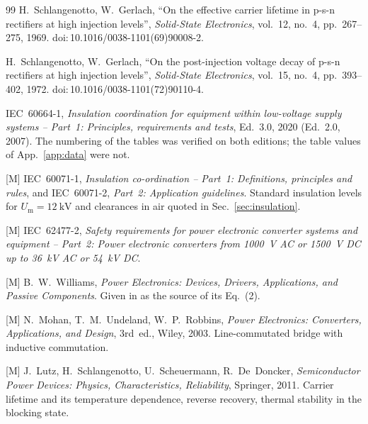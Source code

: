 \documentclass[10pt,a4paper]{scrartcl}
\begin{document}
\begin{thebibliography}{99}
H.~Schlangenotto, W.~Gerlach, ``On the effective carrier lifetime in p-s-n rectifiers at high injection levels'', \emph{Solid-State Electronics}, vol.~12, no.~4, pp.~267--275, 1969. doi:\,10.1016/0038-1101(69)90008-2.

H.~Schlangenotto, W.~Gerlach, ``On the post-injection voltage decay of p-s-n rectifiers at high injection levels'', \emph{Solid-State Electronics}, vol.~15, no.~4, pp.~393--402, 1972. doi:\,10.1016/0038-1101(72)90110-4.

IEC~60664-1, \emph{Insulation coordination for equipment within low-voltage supply systems -- Part~1: Principles, requirements and tests}, Ed.~3.0, 2020 (Ed.~2.0, 2007). The numbering of the tables was verified on both editions; the table values of App.~\ref{app:data} were not.

[M] IEC~60071-1, \emph{Insulation co-ordination -- Part~1: Definitions, principles and rules}, and IEC~60071-2, \emph{Part~2: Application guidelines}. Standard insulation levels for $U_\mathrm{m} = \SI{12}{\kilo\volt}$ and clearances in air quoted in Sec.~\ref{sec:insulation}.

[M] IEC~62477-2, \emph{Safety requirements for power electronic converter systems and equipment -- Part~2: Power electronic converters from 1000~V AC or 1500~V DC up to 36~kV AC or 54~kV DC}.

[M] B.~W.~Williams, \emph{Power Electronics: Devices, Drivers, Applications, and Passive Components}. Given in \cite{an6531} as the source of its Eq.~(2).

[M] N.~Mohan, T.~M.~Undeland, W.~P.~Robbins, \emph{Power Electronics: Converters, Applications, and Design}, 3rd~ed., Wiley, 2003. Line-commutated bridge with inductive commutation.

[M] J.~Lutz, H.~Schlangenotto, U.~Scheuermann, R.~De~Doncker, \emph{Semiconductor Power Devices: Physics, Characteristics, Reliability}, Springer, 2011. Carrier lifetime and its temperature dependence, reverse recovery, thermal stability in the blocking state.

\end{thebibliography}
\end{document}
